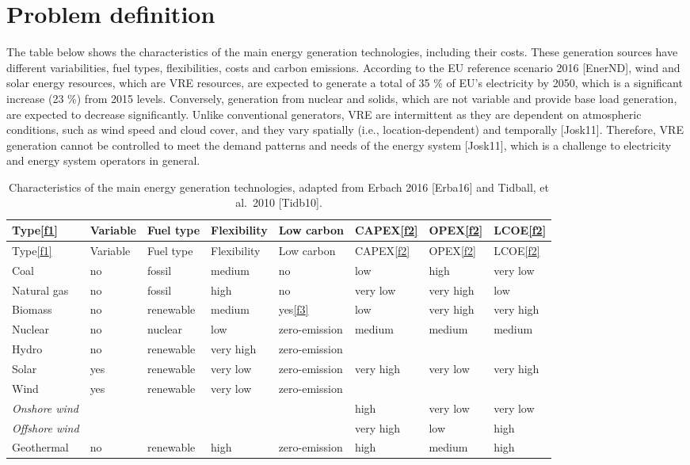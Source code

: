 \hypertarget{problem-definition}{%
\section{Problem definition}\label{problem-definition}}

The table below shows the characteristics of the main energy generation
technologies, including their costs. These generation sources have
different variabilities, fuel types, flexibilities, costs and carbon
emissions. According to the EU reference scenario 2016 {[}EnerND{]},
wind and solar energy resources, which are VRE resources, are expected
to generate a total of 35 \% of EU's electricity by 2050, which is a
significant increase (23 \%) from 2015 levels. Conversely, generation
from nuclear and solids, which are not variable and provide base load
generation, are expected to decrease significantly. Unlike conventional
generators, VRE are intermittent as they are dependent on atmospheric
conditions, such as wind speed and cloud cover, and they vary spatially
(i.e., location-dependent) and temporally {[}Josk11{]}. Therefore, VRE
generation cannot be controlled to meet the demand patterns and needs of
the energy system {[}Josk11{]}, which is a challenge to electricity and
energy system operators in general.

\begin{longtable}[]{@{}llllllll@{}}
\caption{Characteristics of the main energy generation technologies,
adapted from Erbach 2016 {[}Erba16{]} and Tidball, et al.~2010
{[}Tidb10{]}.}\tabularnewline
\toprule
Type\protect\hyperlink{f1}{{[}f1{]}} & Variable & Fuel type &
Flexibility & Low carbon & CAPEX\protect\hyperlink{f2}{{[}f2{]}} &
OPEX\protect\hyperlink{f2}{{[}f2{]}} &
LCOE\protect\hyperlink{f2}{{[}f2{]}}\tabularnewline
\midrule
\endfirsthead
\toprule
Type\protect\hyperlink{f1}{{[}f1{]}} & Variable & Fuel type &
Flexibility & Low carbon & CAPEX\protect\hyperlink{f2}{{[}f2{]}} &
OPEX\protect\hyperlink{f2}{{[}f2{]}} &
LCOE\protect\hyperlink{f2}{{[}f2{]}}\tabularnewline
\midrule
\endhead
Coal & no & fossil & medium & no & low & high & very low\tabularnewline
Natural gas & no & fossil & high & no & very low & very high &
low\tabularnewline
Biomass & no & renewable & medium & yes\protect\hyperlink{f3}{{[}f3{]}}
& low & very high & very high\tabularnewline
Nuclear & no & nuclear & low & zero-emission & medium & medium &
medium\tabularnewline
Hydro & no & renewable & very high & zero-emission & & &\tabularnewline
Solar & yes & renewable & very low & zero-emission & very high & very
low & very high\tabularnewline
Wind & yes & renewable & very low & zero-emission & & &\tabularnewline
\emph{Onshore wind} & & & & & high & very low & very low\tabularnewline
\emph{Offshore wind} & & & & & very high & low & high\tabularnewline
Geothermal & no & renewable & high & zero-emission & high & medium &
high\tabularnewline
\bottomrule
\end{longtable}


